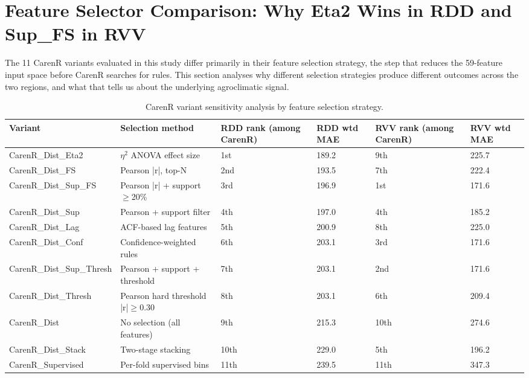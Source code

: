 

\section{Feature Selector Comparison: Why Eta2 Wins in RDD and Sup\_FS in RVV}\label{sec:feature_selector_comparison_why}

The 11 CarenR variants evaluated in this study differ primarily in their feature selection strategy, the step that reduces the 59-feature input space before CarenR searches for rules. This section analyses why different selection strategies produce different outcomes across the two regions, and what that tells us about the underlying agroclimatic signal.

\begin{table}[htbp]
  \centering
  \caption{CarenR variant sensitivity analysis by feature selection strategy.}\label{tab:ch5c_1}
  \small
  \begin{adjustbox}{max width=\textwidth}
    \begin{tabularx}{\textwidth}{p{3.2cm}|p{3.6cm}|p{1.7cm}|p{1.5cm}|p{1.7cm}|X}
  \toprule
  Variant & Selection method & RDD rank
(among CarenR) & RDD wtd MAE & RVV rank
(among CarenR) & RVV wtd MAE \\
  \midrule
  CarenR\_Dist\_Eta2 & $\eta$$^2$ ANOVA effect size & 1st & 189.2 & 9th & 225.7 \\
  CarenR\_Dist\_FS & Pearson |r|, top-N & 2nd & 193.5 & 7th & 222.4 \\
  CarenR\_Dist\_Sup\_FS & Pearson |r| + support $\geq$20\% & 3rd & 196.9 & 1st & 171.6 \\
  CarenR\_Dist\_Sup & Pearson + support filter & 4th & 197.0 & 4th & 185.2 \\
  CarenR\_Dist\_Lag & ACF-based lag features & 5th & 200.9 & 8th & 225.0 \\
  CarenR\_Dist\_Conf & Confidence-weighted rules & 6th & 203.1 & 3rd & 171.6 \\
  CarenR\_Dist\_Sup\_Thresh & Pearson + support + threshold & 7th & 203.1 & 2nd & 171.6 \\
  CarenR\_Dist\_Thresh & Pearson hard threshold |r|$\geq$0.30 & 8th & 203.1 & 6th & 209.4 \\
  CarenR\_Dist & No selection (all features) & 9th & 215.3 & 10th & 274.6 \\
  CarenR\_Dist\_Stack & Two-stage stacking & 10th & 229.0 & 5th & 196.2 \\
  CarenR\_Supervised & Per-fold supervised bins & 11th & 239.5 & 11th & 347.3 \\
  \bottomrule
\end{tabularx}
  \end{adjustbox}

\end{table}


